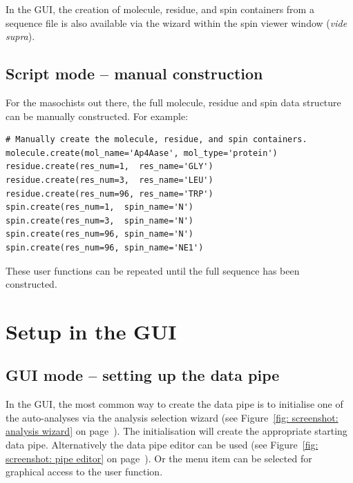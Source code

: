 In the GUI, the creation of molecule, residue, and spin containers from a sequence file is also available via the  wizard within the spin viewer window (\textit{vide supra}).



\subsection{Script mode -- manual construction} \label{sect: script - manual construction}

For the masochists out there, the full molecule, residue and spin data structure can be manually constructed.
For example:

\begin{lstlisting}
# Manually create the molecule, residue, and spin containers.
molecule.create(mol_name='Ap4Aase', mol_type='protein')
residue.create(res_num=1,  res_name='GLY')
residue.create(res_num=3,  res_name='LEU')
residue.create(res_num=96, res_name='TRP')
spin.create(res_num=1,  spin_name='N')
spin.create(res_num=3,  spin_name='N')
spin.create(res_num=96, spin_name='N')
spin.create(res_num=96, spin_name='NE1')
\end{lstlisting}

These user functions can be repeated until the full sequence has been constructed.




\section{Setup in the GUI}



\subsection{GUI mode -- setting up the data pipe} \label{sect: GUI - data pipe}

In the GUI, the most common way to create the data pipe is to initialise one of the auto-analyses via the analysis selection wizard (see Figure~\ref{fig: screenshot: analysis wizard} on page~\pageref{fig: screenshot: analysis wizard}).
The initialisation will create the appropriate starting data pipe.
Alternatively the data pipe editor can be used (see Figure~\ref{fig: screenshot: pipe editor} on page~\pageref{fig: screenshot: pipe editor}).
Or the  menu item can be selected for graphical access to the  user function.



